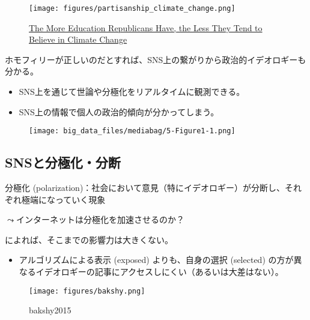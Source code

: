 \documentclass[
  xelatex,
  ja=standard]{bxjsarticle}
\providecommand{\tightlist}{%
  \setlength{\itemsep}{0pt}\setlength{\parskip}{0pt}}\usepackage{longtable,booktabs,array}
\begin{document}
\begin{figure}[htpb]

{\centering \texttt{[image: figures/partisanship\_climate\_change.png]}

}

\caption{\href{https://www.nytimes.com/interactive/2017/11/14/upshot/climate-change-by-education.html}{The
More Education Republicans Have, the Less They Tend to Believe in
Climate Change}}

\end{figure}

ホモフィリーが正しいのだとすれば、SNS上の繋がりから政治的イデオロギーも分かる。

\begin{itemize}
\tightlist
\item
  SNS上を通じて世論や分極化をリアルタイムに観測できる。
\item
  SNS上の情報で個人の政治的傾向が分かってしまう。
\end{itemize}

\begin{figure}[htpb]

{\centering \texttt{[image: big\_data\_files/mediabag/5-Figure1-1.png]}

}

\caption{\citet{barbera2015}}

\end{figure}

\hypertarget{snsux3068ux5206ux6975ux5316ux5206ux65ad}{%
\subsection{SNSと分極化・分断}\label{snsux3068ux5206ux6975ux5316ux5206ux65ad}}

分極化
(polarization)：社会において意見（特にイデオロギー）が分断し、それぞれ極端になっていく現象

\(\leadsto\)インターネットは分極化を加速させるのか？

\citet[第5章]{inamasu2022}によれば、そこまでの影響力は大きくない。

\begin{itemize}
\tightlist
\item
  アルゴリズムによる表示 (exposed) よりも、自身の選択 (selected)
  の方が異なるイデオロギーの記事にアクセスしにくい（あるいは大差はない）。
\end{itemize}

\begin{figure}[htpb]

{\centering \texttt{[image: figures/bakshy.png]}

}

\caption{bakshy2015}

\end{figure}
\end{document}
